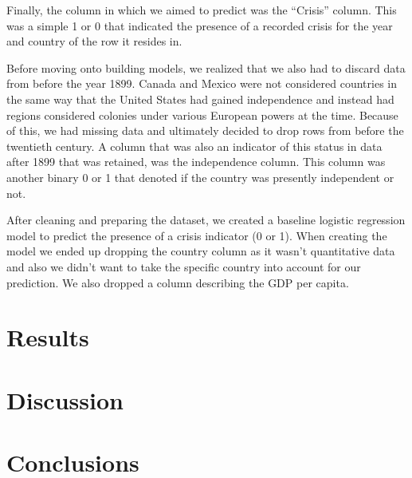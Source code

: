\documentclass[12pt]{article}
\begin{document}
Finally, the column in which we aimed to predict was the “Crisis” column. This was a simple 1 or 0 that indicated the presence of a recorded crisis for the year and country of the row it resides in.

Before moving onto building models, we realized that we also had to discard data from before the year 1899. Canada and Mexico were not considered countries in the same way that the United States had gained independence and instead had regions considered colonies under various European powers at the time. Because of this, we had missing data and ultimately decided to drop rows from before the twentieth century. A column that was also an indicator of this status in data after 1899 that was retained, was the independence column. This column was another binary 0 or 1 that denoted if the country was presently independent or not.

After cleaning and preparing the dataset, we created a baseline logistic regression model to predict the presence of a crisis indicator (0 or 1). When creating the model we ended up dropping the country column as it wasn’t quantitative data and also we didn’t want to take the specific country into account for our prediction. We also dropped a column describing the GDP per capita.


\section{Results}

\section{Discussion}

\section{Conclusions}



\printbibliography
\end{document}
